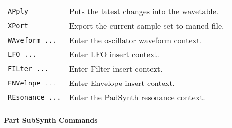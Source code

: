    \begin{table}
      \begin{tabular}{l l}
\texttt{APply} &
   Puts the latest changes into the wavetable. \\
\texttt{XPort} &
   Export the current sample set to maned file. \\
\texttt{WAveform ...} &
   Enter the oscillator waveform context. \\
\texttt{LFO ...} &
   Enter LFO insert context.  \\
\texttt{FILter ...} &
   Enter Filter insert context.  \\
\texttt{ENVelope ...} &
   Enter Envelope insert context.   \\
\texttt{REsonance ...} &
   Enter the PadSynth resonance context. \\
      \end{tabular}
   \end{table}


\paragraph{Part SubSynth Commands}
\label{paragraph:command_line_part_subsynth_commands}

